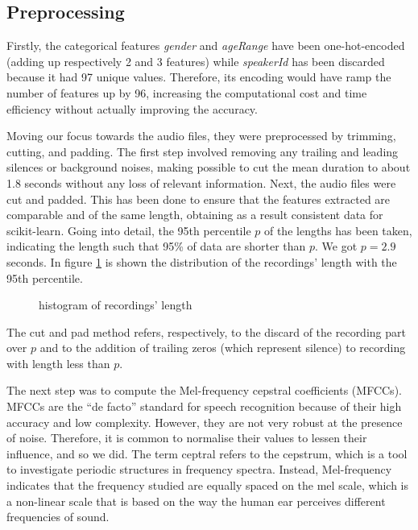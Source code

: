 \documentclass[conference]{IEEEtran}
\begin{document}
\subsection{Preprocessing}

Firstly, the categorical features \textit{gender} and \textit{ageRange} have been one-hot-encoded (adding up respectively 2 and 3 features) while \textit{speakerId} has been discarded because it had 97 unique values.
Therefore, its encoding would have ramp the number of features up by 96, increasing the computational cost and time efficiency without actually improving the accuracy.

Moving our focus towards the audio files, they were preprocessed by trimming, cutting, and padding.
The first step involved removing any trailing and leading silences or background noises, making possible to cut the mean duration to about 1.8 seconds without any loss of relevant information.
Next, the audio files were cut and padded.
This has been done to ensure that the features extracted are comparable and of the same length, obtaining as a result consistent data for scikit-learn.
Going into detail, the 95th percentile $p$ of the lengths has been taken, indicating the length such that 95\% of data are shorter than $p$.
We got $p = 2.9$ seconds.
In figure \ref{fig:perc} is shown the distribution of the recordings' length with the 95th percentile.

\begin{figure}
    \centering
    
    \caption{histogram of recordings' length}
    \label{fig:perc}
\end{figure}

The cut and pad method refers, respectively, to the discard of the recording part over $p$ and to the addition of trailing zeros (which represent silence) to recording with length less than $p$.

The next step was to compute the Mel-frequency cepstral coefficients (MFCCs).
MFCCs are the “de facto” standard for speech recognition because of their high accuracy and low complexity.
However, they are not very robust at the presence of noise.
Therefore, it is common to normalise their values to lessen their influence, and so we did.
The term ceptral refers to the cepstrum, which is a tool to investigate periodic structures in frequency spectra.
Instead, Mel-frequency indicates that the frequency studied are equally spaced on the mel scale, which is a non-linear scale that is based on the way the human ear perceives different frequencies of sound.
\end{document}

